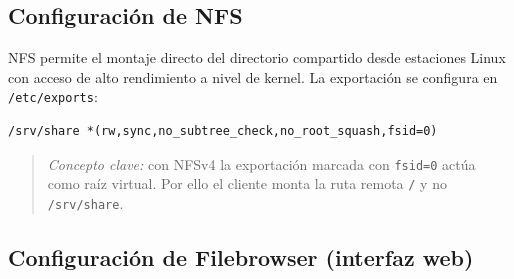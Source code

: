 \subsection{Configuración de NFS}

NFS permite el montaje directo del directorio compartido desde estaciones
Linux con acceso de alto rendimiento a nivel de kernel. La exportación se
configura en \texttt{/etc/exports}:

\begin{lstlisting}[style=terminal]
/srv/share *(rw,sync,no_subtree_check,no_root_squash,fsid=0)
\end{lstlisting}

\begin{table}[H]
\centering
\caption{Opciones de exportación NFS}
\label{tab:opciones-nfs}
\end{table}

\begin{quote}
\small\textit{Concepto clave:} con NFSv4 la exportación marcada con
\texttt{fsid=0} actúa como raíz virtual. Por ello el cliente monta la ruta
remota \texttt{/} y no \texttt{/srv/share}.
\end{quote}

\subsection{Configuración de Filebrowser (interfaz web)}

